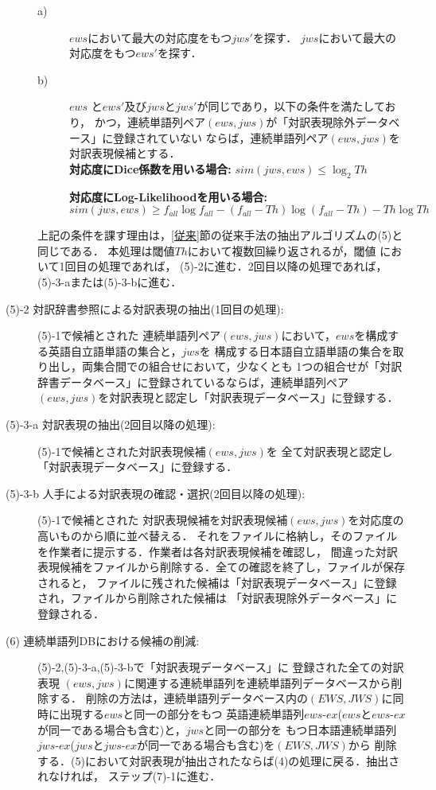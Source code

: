 \begin{description}
  \begin{description}
  \item[a)] $ews$において最大の対応度をもつ$jws'$を探す．
$jws$において最大の対応度をもつ$ews'$を探す．
  \item[b)] $ews$ と$ews'$及び$jws$と$jws'$が同じであり，以下の条件を満たしており，
かつ，連続単語列ペア$(ews,jws)$が「対訳表現除外データベース」に登録されていない
ならば，連続単語列ペア$(ews,jws)$を対訳表現候補とする．\\

{\bf 対応度にDice係数を用いる場合:} $sim(jws,ews) \leq \log_{2} Th $

{\bf 対応度にLog-Likelihoodを用いる場合:}
\[ sim(jws,ews) \geq f_{all}\log f_{all}-(f_{all}-Th)\log(f_{all}-Th)-Th\log Th \]
  \end{description}
             
上記の条件を課す理由は，\ref{従来}節の従来手法の抽出アルゴリズムの(5)と同じである．
本処理は閾値$Th$において複数回繰り返されるが，閾値 において1回目の処理であれば，
(5)-2に進む．2回目以降の処理であれば，(5)-3-aまたは(5)-3-bに進む．

\item[(5)-2 対訳辞書参照による対訳表現の抽出(1回目の処理):] (5)-1で候補とされた
連続単語列ペア$(ews,jws)$において，$ews$を構成する英語自立語単語の集合と，$jws$を
構成する日本語自立語単語の集合を取り出し，両集合間での組合せにおいて，少なくとも
1つの組合せが「対訳辞書データベース」に登録されているならば，連続単語列ペア
$(ews,jws)$を対訳表現と認定し「対訳表現データベース」に登録する．

\item[(5)-3-a 対訳表現の抽出(2回目以降の処理):](5)-1で候補とされた対訳表現候補$(ews,jws)$を
全て対訳表現と認定し「対訳表現データベース」に登録する．

\item[(5)-3-b 人手による対訳表現の確認・選択(2回目以降の処理):] (5)-1で候補とされた
対訳表現候補を対訳表現候補$(ews,jws)$を対応度の高いものから順に並べ替える．
それをファイルに格納し，そのファイルを作業者に提示する．作業者は各対訳表現候補を確認し，
間違った対訳表現候補をファイルから削除する．全ての確認を終了し，ファイルが保存されると，
ファイルに残された候補は「対訳表現データベース」に登録され，ファイルから削除された候補は
「対訳表現除外データベース」に登録される．

\item[(6) 連続単語列DBにおける候補の削減:] (5)-2,(5)-3-a,(5)-3-bで「対訳表現データベース」に
登録された全ての対訳表現 $(ews,jws)$に関連する連続単語列を連続単語列データベースから削除する．
削除の方法は，連続単語列データベース内の$(EWS,JWS)$に同時に出現する$ews$と同一の部分をもつ
英語連続単語列$ews$-$ex$($ews$と$ews$-$ex$が同一である場合も含む)と，$jws$と同一の部分を
もつ日本語連続単語列$jws$-$ex$($jws$と$jws$-$ex$が同一である場合も含む)を$(EWS,JWS)$から
削除する．(5)において対訳表現が抽出されたならば(4)の処理に戻る．抽出されなければ，
ステップ(7)-1に進む．


\end{description}
